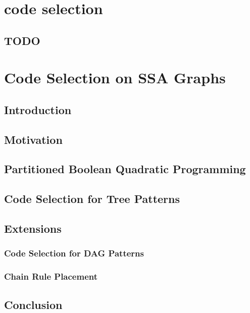 \applynumberofpages\chapter{code selection }
\section{TODO}


\chapter{Code Selection on SSA Graphs}    %


\section{Introduction} %


\section{Motivation} %


\section{Partitioned Boolean Quadratic Programming} %


\section{Code Selection for Tree Patterns} %


\section{Extensions} %

\subsection{Code Selection for DAG Patterns} %



\subsection{Chain Rule Placement} %



\section{Conclusion} %

